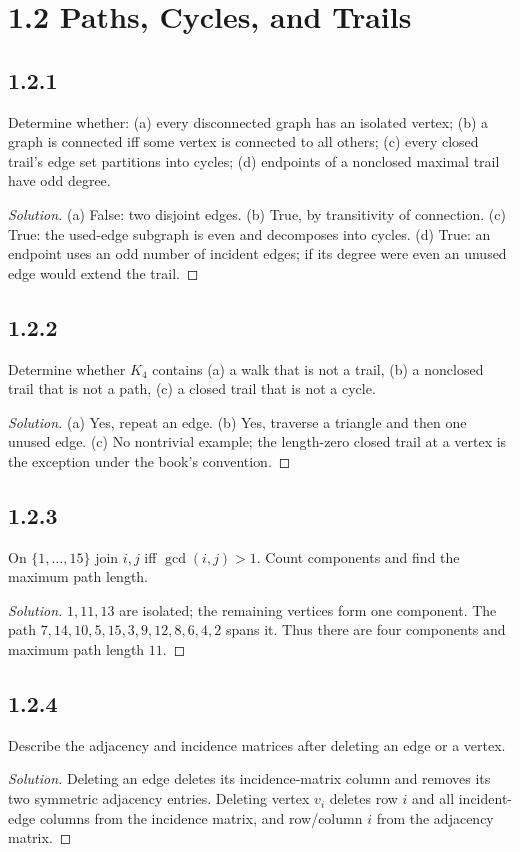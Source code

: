\documentclass[12pt]{amsart}
\newenvironment{solution}{\begin{proof}[Solution]}{\end{proof}}
\begin{document}
    \section*{1.2 Paths, Cycles, and Trails}
    \subsection*{1.2.1} Determine whether: (a) every disconnected graph has an isolated vertex; (b) a graph is connected iff some vertex is connected to all others; (c) every closed trail's edge set partitions into cycles; (d) endpoints of a nonclosed maximal trail have odd degree.
    \begin{solution}(a) False: two disjoint edges. (b) True, by transitivity of connection. (c) True: the used-edge subgraph is even and decomposes into cycles. (d) True: an endpoint uses an odd number of incident edges; if its degree were even an unused edge would extend the trail.\end{solution}
    \subsection*{1.2.2} Determine whether $K_4$ contains (a) a walk that is not a trail, (b) a nonclosed trail that is not a path, (c) a closed trail that is not a cycle.
    \begin{solution}(a) Yes, repeat an edge. (b) Yes, traverse a triangle and then one unused edge. (c) No nontrivial example; the length-zero closed trail at a vertex is the exception under the book's convention.\end{solution}
    \subsection*{1.2.3} On $\{1,\ldots,15\}$ join $i,j$ iff $\gcd(i,j)>1$. Count components and find the maximum path length.
    \begin{solution}$1,11,13$ are isolated; the remaining vertices form one component. The path
        $7,14,10,5,15,3,9,12,8,6,4,2$ spans it. Thus there are four components and maximum path length $11$.\end{solution}
    \subsection*{1.2.4} Describe the adjacency and incidence matrices after deleting an edge or a vertex.
    \begin{solution}Deleting an edge deletes its incidence-matrix column and removes its two symmetric adjacency entries. Deleting vertex $v_i$ deletes row $i$ and all incident-edge columns from the incidence matrix, and row/column $i$ from the adjacency matrix.\end{solution}
\end{document}
